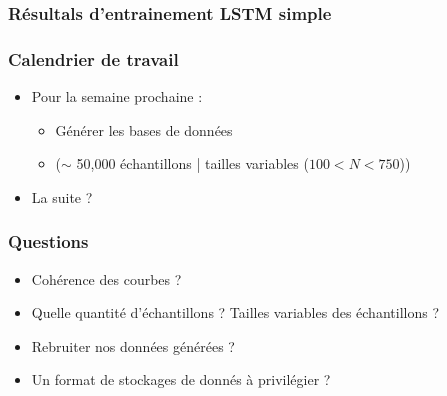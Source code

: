 \documentclass{beamer}
\begin{document}
	\begin{frame}
		\frametitle{Résultals d'entrainement LSTM simple}
		
	\end{frame}
	
	\begin{frame}
		\frametitle{Calendrier de travail}
		\begin{itemize}
			\item Pour la semaine prochaine : 
			\begin{itemize}
				\item[\hspace{1cm}] Générer les bases de données 
				\item[\hspace{2cm}] ($\sim$ 50,000 échantillons | tailles variables ($100 < N < 750$))
			\end{itemize}
			\item La suite ?
		\end{itemize}
	\end{frame}
	
	\begin{frame}
		\frametitle{Questions}
		\begin{itemize}
			\item Cohérence des courbes ?
			\item Quelle quantité d'échantillons ? Tailles variables des échantillons ?
			\item Rebruiter nos données générées ? 
			\item Un format de stockages de donnés à privilégier ?
		\end{itemize}
	\end{frame}
	
\end{document}
